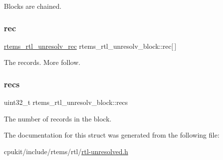 Blocks are chained. \mbox{\label{structrtems__rtl__unresolv__block_ac222487664347952eab3ab119e8a6b63}} 
\subsubsection{\texorpdfstring{rec}{rec}}
{\footnotesize\ttfamily \mbox{\hyperlink{structrtems__rtl__unresolv__rec}{rtems\+\_\+rtl\+\_\+unresolv\+\_\+rec}} rtems\+\_\+rtl\+\_\+unresolv\+\_\+block\+::rec\mbox{[}$\,$\mbox{]}}

The records. More follow. \mbox{\label{structrtems__rtl__unresolv__block_aa0fc428e43fb0926b0ac6523b8279b94}} 
\subsubsection{\texorpdfstring{recs}{recs}}
{\footnotesize\ttfamily uint32\+\_\+t rtems\+\_\+rtl\+\_\+unresolv\+\_\+block\+::recs}

The number of records in the block. 

The documentation for this struct was generated from the following file\+:\begin{DoxyCompactItemize}
\item 
cpukit/include/rtems/rtl/\mbox{\hyperlink{rtl-unresolved_8h}{rtl-\/unresolved.\+h}}\end{DoxyCompactItemize}
